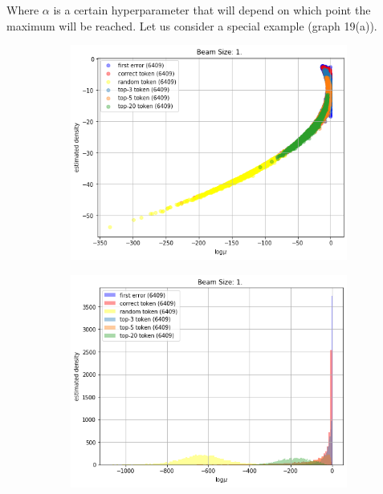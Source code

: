 \documentclass[a4paper,14pt]{extarticle}
\begin{document}
	 Where $\alpha$ is a certain hyperparameter that will depend on which point the maximum will be reached. Let us consider a special example (graph 19(a)).
	\begin{figure}[t]
		\begin{subfigure}{.5\textwidth}
			\includegraphics[width=\textwidth]{images/calibration_g2_scatter.png}
		\end{subfigure}
		\begin{subfigure}{.5\textwidth}
			\includegraphics[width=\textwidth]{images/calibration_g2_probs.png}
		\end{subfigure}
	\end{figure}
	
\end{document}
